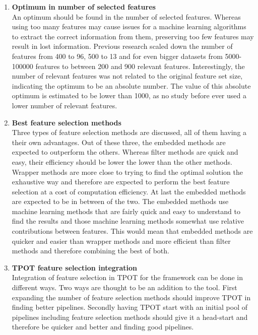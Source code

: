 	\begin{enumerate}
		\item \textbf{Optimum in number of selected features} \\
		An optimum should be found in the number of selected features. Whereas using too many features may cause issues for a machine learning algorithms to extract the correct information from them, preserving too few features may result in lost information. Previous research scaled down the number of features from 400 to 96\cite{pazzani1997learning}, 500 to 13 and for even bigger datasets from 5000-100000 features to between 200 and 900 relevant features\cite{chen2006combining}. Interestingly, the number of relevant features was not related to the original feature set size, indicating the optimum to be an absolute number. The value of this absolute optimum is estimated to be lower than 1000, as no study before ever used a lower number of relevant features.
		\item \textbf{Best feature selection methods} \\
		Three types of feature selection methods are discussed, all of them having a their own advantages. Out of these three, the embedded methods are expected to outperform the others. Whereas filter methods are quick and easy, their efficiency should be lower the lower than the other methods. Wrapper methods are more close to trying to find the optimal solution the exhaustive way and therefore are expected to perform the best feature selection at a cost of computation efficiency. At last the embedded methods are expected to be in between of the two. The embedded methods use machine learning methods that are fairly quick and easy to understand to find the results and those machine learning methods somewhat use relative contributions between features. This would mean that embedded methods are quicker and easier than wrapper methods and more efficient than filter methods and therefore combining the best of both.
		\item \textbf{TPOT feature selection integration} \\
		Integration of feature selection in TPOT for the framework can be done in different ways. Two ways are thought to be an addition to the tool. First expanding the number of feature selection methods should improve TPOT in finding better pipelines. Secondly having TPOT start with an initial pool of pipelines including feature selection methods should give it a head-start and therefore be quicker and better and finding good pipelines.		
	\end{enumerate}
	
